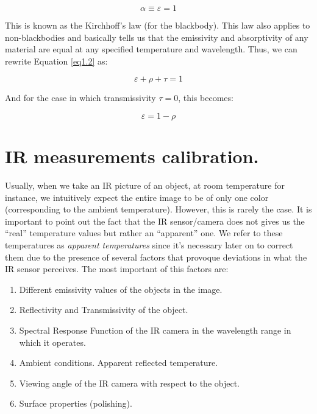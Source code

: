 		\begin{equation}\label{eq1.5}
			\alpha \equiv \varepsilon=1
		\end{equation}\bigskip	
		
		This is known as the Kirchhoff’s law (for the blackbody). This law also applies to non-blackbodies and basically tells us that the emissivity and absorptivity of any material are equal at any specified temperature and wavelength. Thus, we can rewrite Equation \ref{eq1.2} as:
		
		\begin{equation}\label{eq1.6}
			\varepsilon + \rho + \tau = 1
		\end{equation}\bigskip	
	
		And for the case in which transmissivity $\tau=0$, this becomes:
		
		\begin{equation}\label{eq1.7}
			\varepsilon = 1 - \rho
		\end{equation}\bigskip	
	
	\section{IR measurements calibration.}\label{section1.4}
	
		Usually, when we take an IR picture of an object, at room temperature for instance, we intuitively expect the entire image to be of only one color (corresponding to the ambient temperature). However, this is rarely the case. It is important to point out the fact that the IR sensor/camera does not gives us the “real” temperature values but rather an “apparent” one. We refer to these temperatures as \textit{apparent temperatures} since it’s necessary later on to correct them due to the presence of several factors that provoque deviations in what the IR sensor perceives. The most important of this factors are:
		
		\begin{enumerate}[label={\arabic*.}]
			\item Different emissivity values of the objects in the image.
			\item Reflectivity and Transmissivity of the object.
			\item Spectral Response Function of the IR camera in the wavelength range in which it operates.
			\item Ambient conditions. Apparent reflected temperature.
			\item Viewing angle of the IR camera with respect to the object.
			\item Surface properties (polishing).
		\end{enumerate}
		
